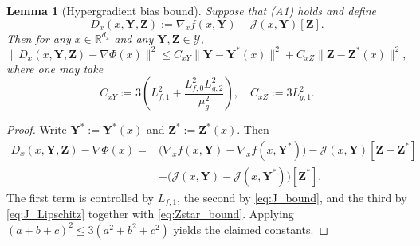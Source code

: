 \documentclass{pkumelon}
\theoremstyle{plain}
\newtheorem{lemma}{Lemma}
\newcommand{\R}{\mathbb{R}}
\newcommand{\Phiobj}{\Phi}
\begin{document}
\begin{lemma}[Hypergradient bias bound]\label{lem:hypergrad_bias}
Suppose that \emph{(A1)} holds and define
\begin{equation}\label{eq:def_Dx_matrix}
D_x(x,\boldsymbol Y,\boldsymbol Z):=\nabla_x f(x,\boldsymbol Y)-\mathcal J(x,\boldsymbol Y)[\boldsymbol Z].
\end{equation}
Then for any $x\in\R^{d_x}$ and any $\boldsymbol Y,\boldsymbol Z\in\mathcal Y$,
\begin{equation}\label{eq:hypergrad_bias_bound}
\|D_x(x,\boldsymbol Y,\boldsymbol Z)-\nabla\Phiobj(x)\|^2
\le C_{xY}\|\boldsymbol Y-\boldsymbol Y^*(x)\|^2+C_{xZ}\|\boldsymbol Z-\boldsymbol Z^*(x)\|^2,
\end{equation}
where one may take
\begin{equation}\label{eq:hypergrad_bias_constants}
C_{xY}:=3\left(L_{f,1}^2+\frac{L_{f,0}^2L_{g,2}^2}{\mu_g^2}\right),
\quad
C_{xZ}:=3L_{g,1}^2.
\end{equation}
\end{lemma}

\begin{proof}
Write $\boldsymbol Y^*:=\boldsymbol Y^*(x)$ and $\boldsymbol Z^*:=\boldsymbol Z^*(x)$. Then
\begin{equation*}
\begin{aligned}
D_x(x,\boldsymbol Y,\boldsymbol Z)-\nabla\Phiobj(x)
={}&\bigl(\nabla_x f(x,\boldsymbol Y)-\nabla_x f(x,\boldsymbol Y^*)\bigr)-\mathcal J(x,\boldsymbol Y)[\boldsymbol Z-\boldsymbol Z^*] \\
&-\bigl(\mathcal J(x,\boldsymbol Y)-\mathcal J(x,\boldsymbol Y^*)\bigr)[\boldsymbol Z^*].
\end{aligned}
\end{equation*}
The first term is controlled by $L_{f,1}$, the second by \eqref{eq:J_bound}, and the third by \eqref{eq:J_Lipschitz} together with \eqref{eq:Zstar_bound}. Applying $(a+b+c)^2\le 3(a^2+b^2+c^2)$ yields the claimed constants.
\end{proof}
\end{document}
